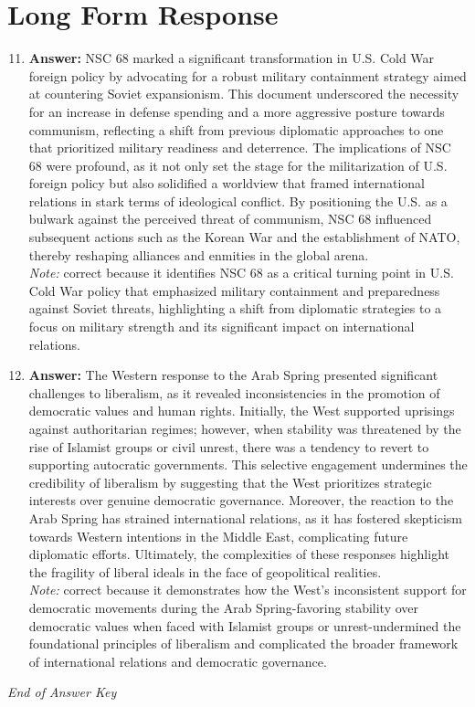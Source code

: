 \documentclass[12pt]{article}
\begin{document}
\section*{Long Form Response}
\begin{enumerate}[label=\arabic*.]
\setcounter{enumi}{10}
\item \textbf{Answer:} NSC 68 marked a significant transformation in U.S. Cold War foreign policy by advocating for a robust military containment strategy aimed at countering Soviet expansionism. This document underscored the necessity for an increase in defense spending and a more aggressive posture towards communism, reflecting a shift from previous diplomatic approaches to one that prioritized military readiness and deterrence. The implications of NSC 68 were profound, as it not only set the stage for the militarization of U.S. foreign policy but also solidified a worldview that framed international relations in stark terms of ideological conflict. By positioning the U.S. as a bulwark against the perceived threat of communism, NSC 68 influenced subsequent actions such as the Korean War and the establishment of NATO, thereby reshaping alliances and enmities in the global arena.
\\ \textit{Note:} correct because it identifies NSC 68 as a critical turning point in U.S. Cold War policy that emphasized military containment and preparedness against Soviet threats, highlighting a shift from diplomatic strategies to a focus on military strength and its significant impact on international relations.
\item \textbf{Answer:} The Western response to the Arab Spring presented significant challenges to liberalism, as it revealed inconsistencies in the promotion of democratic values and human rights. Initially, the West supported uprisings against authoritarian regimes; however, when stability was threatened by the rise of Islamist groups or civil unrest, there was a tendency to revert to supporting autocratic governments. This selective engagement undermines the credibility of liberalism by suggesting that the West prioritizes strategic interests over genuine democratic governance. Moreover, the reaction to the Arab Spring has strained international relations, as it has fostered skepticism towards Western intentions in the Middle East, complicating future diplomatic efforts. Ultimately, the complexities of these responses highlight the fragility of liberal ideals in the face of geopolitical realities.
\\ \textit{Note:} correct because it demonstrates how the West's inconsistent support for democratic movements during the Arab Spring-favoring stability over democratic values when faced with Islamist groups or unrest-undermined the foundational principles of liberalism and complicated the broader framework of international relations and democratic governance.
\end{enumerate}

\vfill
\noindent\textit{End of Answer Key}
\end{document}
